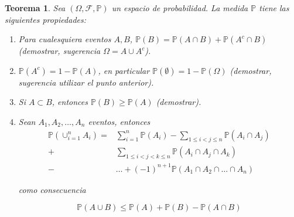 \documentclass[11pt]{report}
\theoremstyle{break}
\newtheorem{teorema}{Teorema}[chapter]
\theoremstyle{break}
\begin{document}
\begin{teorema}
\label{teorema:propiedades de las medidas de probabilidad}
Sea $\left( \Omega, \mathcal{F}, \mathbb{P} \right)$ un espacio de probabilidad. La medida $\mathbb{P}$ tiene las siguientes propiedades:

\begin{enumerate}
\item Para cualesquiera eventos $A,B$, $\mathbb{P}(B) = \mathbb{P}(A \cap B) + \mathbb{P}(A^c \cap B)$ (demostrar, sugerencia $\Omega = A \cup A^c$).

\item $\mathbb{P}(A^c) = 1 - \mathbb{P}(A)$, en particular $\mathbb{P}(\emptyset) = 1 - \mathbb{P}(\Omega)$ (demostrar, sugerencia utilizar el punto anterior).

\item Si $A \subset B$, entonces $\mathbb{P}(B) \geq \mathbb{P}(A)$ (demostrar).

\item Sean $A_1, A_2, \ldots, A_n$  eventos, entonces 
\begin{align*}
\mathbb{P}(\cup_{i=1}^{n}A_i)  = & \sum_{i=1}^{n}\mathbb{P}(A_i) - \sum_{1 \leq i < j \leq n} \mathbb{P}(A_i \cap A_j) \\
+ & \sum_{1 \leq i < j < k \leq n} \mathbb{P}(A_i \cap A_j \cap A_k) \\
- & \ldots + (-1)^{n + 1}\mathbb{P}(A_1 \cap A_2 \cap \ldots \cap A_n)
\end{align*}

como consecuencia

$$
\mathbb{P}(A \cup B) \leq \mathbb{P}(A) + \mathbb{P}(B) - \mathbb{P}(A \cap B)
$$

\end{enumerate}

\end{teorema}
\end{document}
